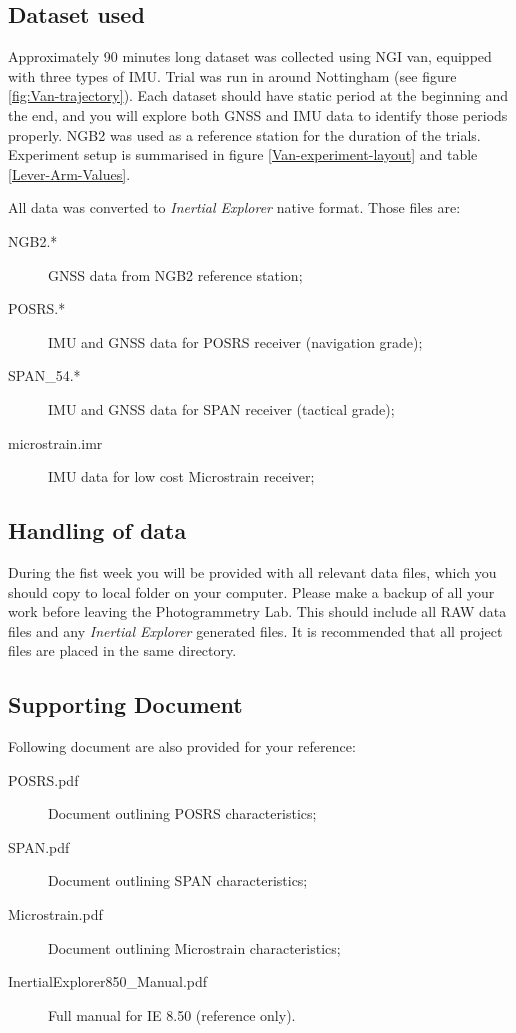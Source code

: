 \documentclass[british,DIV=calc, paper=a4, fontsize=12pt, onecolumn]{scrartcl}
\begin{document}
\subsection{Dataset used}

Approximately 90 minutes long dataset was collected using NGI van, equipped with three types of IMU. Trial was run in around Nottingham (see figure \ref{fig:Van-trajectory}). Each dataset should have static period at the beginning and the end, and you will explore both GNSS and IMU data to identify those periods properly. NGB2 was used as a reference station for the duration of the trials. Experiment setup is summarised  in figure \ref{Van-experiment-layout} and table \ref{Lever-Arm-Values}.

All data was converted to \emph{Inertial Explorer} native format. Those files are:
	\begin{description}
	\item [{NGB2.{*}}] GNSS data from NGB2 reference station;
	\item [{POSRS.{*}}] IMU and GNSS data for POSRS receiver (navigation grade);
	\item [{SPAN\_54.{*}}] IMU and GNSS data for SPAN receiver (tactical grade);
	\item [{microstrain.imr}] IMU data for low cost Microstrain receiver;
	\end{description}

\subsection{Handling of data}
During the fist week you will be provided with all relevant data files, which you should copy to local folder on your computer. Please make a backup of all your work before leaving the Photogrammetry Lab. This should include all RAW data files and any \emph{Inertial Explorer} generated files. It is recommended that all project files are placed in the same directory.

\subsection{Supporting Document}

Following document are also provided for your reference:
	\begin{description}
	\item [{POSRS.pdf}] Document outlining POSRS characteristics;
	\item [{SPAN.pdf}] Document outlining SPAN characteristics;
	\item [{Microstrain.pdf}] Document outlining Microstrain characteristics;
	\item [{InertialExplorer850\_Manual.pdf}] Full manual for IE 8.50 (reference
	only).
	\end{description}
	
\end{document}

